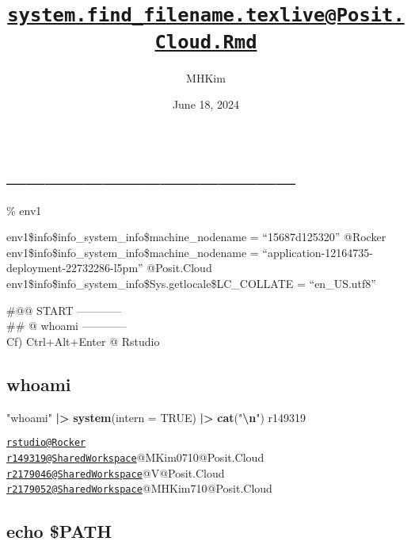 \documentclass[
]{article}
\title{\href{mailto:system.find_filename.texlive@Posit.Cloud.Rmd}{\nolinkurl{system.find\_filename.texlive@Posit.Cloud.Rmd}}}
\author{MHKim}
\date{June 18, 2024}
\newenvironment{Shaded}{\begin{snugshade}}{\end{snugshade}}
\newcommand{\AttributeTok}[1]{\textcolor[rgb]{0.13,0.29,0.53}{#1}}
\newcommand{\ConstantTok}[1]{\textcolor[rgb]{0.56,0.35,0.01}{#1}}
\newcommand{\FunctionTok}[1]{\textcolor[rgb]{0.13,0.29,0.53}{\textbf{#1}}}
\newcommand{\NormalTok}[1]{#1}
\newcommand{\SpecialCharTok}[1]{\textcolor[rgb]{0.81,0.36,0.00}{\textbf{#1}}}
\newcommand{\StringTok}[1]{\textcolor[rgb]{0.31,0.60,0.02}{#1}}
\begin{document}
\maketitle

{
\setcounter{tocdepth}{6}
\tableofcontents
}
\hypertarget{section}{%
\section{\_\_\_\_\_\_\_\_\_\_\_\_\_\_\_}\label{section}}

\% env1~

env1\$info\$info\_system\_info\$machine\_nodename = ``15687d125320''
@Rocker\\
env1\$info\$info\_system\_info\$machine\_nodename =
``application-12164735-deployment-22732286-l5pm'' @Posit.Cloud\\
env1\$info\$info\_system\_info\$Sys.getlocale\$LC\_COLLATE =
``en\_US.utf8''

\#@@ START ------------\\
\#\# @ whoami ------------\\
Cf) Ctrl+Alt+Enter @ Rstudio

\hypertarget{whoami}{%
\subsection{whoami}\label{whoami}}

\begin{Shaded}
\begin{Highlighting}[]
\StringTok{"whoami"} \SpecialCharTok{|\textgreater{}}
    \FunctionTok{system}\NormalTok{(}\AttributeTok{intern =} \ConstantTok{TRUE}\NormalTok{) }\SpecialCharTok{|\textgreater{}}
    \FunctionTok{cat}\NormalTok{(}\StringTok{"}\SpecialCharTok{\textbackslash{}n}\StringTok{"}\NormalTok{)}
\NormalTok{r149319 }
\end{Highlighting}
\end{Shaded}

\href{mailto:rstudio@Rocker}{\nolinkurl{rstudio@Rocker}}\\
\href{mailto:r149319@SharedWorkspace}{\nolinkurl{r149319@SharedWorkspace}}@MKim0710@Posit.Cloud\\
\href{mailto:r2179046@SharedWorkspace}{\nolinkurl{r2179046@SharedWorkspace}}@V@Posit.Cloud\\
\href{mailto:r2179052@SharedWorkspace}{\nolinkurl{r2179052@SharedWorkspace}}@MHKim710@Posit.Cloud

\hypertarget{echo-path}{%
\subsection{echo \$PATH}\label{echo-path}}
\end{document}
